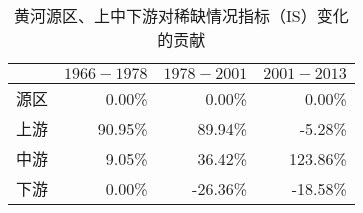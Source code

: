 \begin{table}[!ht]
  \centering
  \caption{黄河源区、上中下游对稀缺情况指标（IS）变化的贡献}
    \begin{tabularx}{0.5\textwidth}{lrrr}
    \toprule
          & \multicolumn{1}{l}{$1966-1978$} & \multicolumn{1}{l}{$1978-2001$} & \multicolumn{1}{l}{$2001-2013$} \\
    \midrule
    源区 & 0.00\% & 0.00\% & 0.00\% \\
    上游 & 90.95\% & 89.94\% & -5.28\% \\
    中游 & 9.05\% & 36.42\% & 123.86\% \\
    下游 & 0.00\% & -26.36\% & -18.58\% \\
    \bottomrule
    \end{tabularx}%
  \label{ch4:tab:sfv_contribution}%
\end{table}%
